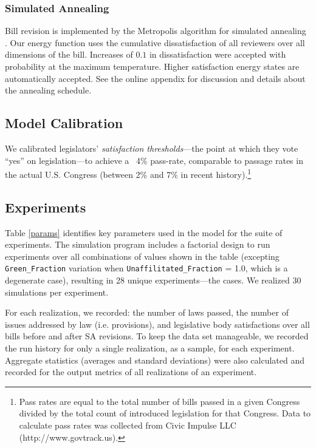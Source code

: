 \documentclass[pdftex,12pt,oribibl]{llncs}
\begin{document}
\subsubsection{Simulated Annealing}
Bill revision is implemented by the Metropolis algorithm for simulated annealing \parencite{mrrt53, kgv}.
Our energy function uses the cumulative dissatisfaction of all reviewers over all dimensions of the bill. 
Increases of $0.1$ in dissatisfaction were accepted with probability  at the maximum temperature. 
Higher satisfaction energy states are automatically accepted.
See the online appendix for discussion and details about the annealing schedule.

\subsection{Model Calibration}
We calibrated legislators' \textit{satisfaction thresholds}---the point at which they vote ``yes'' on legislation---to achieve a ~4\% pass-rate, comparable to passage rates in the actual U.S. Congress (between 2\% and 7\% in recent history).\footnote{Pass rates are equal to the total number of bills passed in a given Congress divided by the total count of introduced legislation for that Congress. Data to calculate pass rates was collected from Civic Impulse LLC (http://www.govtrack.us).\label{passfn}}

\subsection{Experiments}
Table \ref{params} identifies key parameters used in the model for the suite of experiments.
The simulation program includes a factorial design to run experiments over all combinations of values shown in the table (excepting \texttt{Green\_Fraction} variation when {\texttt{Unaffilitated\_Fraction} = 1.0}, which is a degenerate case), resulting in 28 unique experiments---the cases.
We realized 30 simulations per experiment.

For each realization, we recorded: the number of laws passed, the number of issues addressed by law (i.e. provisions), and legislative body satisfactions over all bills before and after SA revisions. 
To keep the data set manageable, we recorded the run history for only a single realization, as a sample, for each experiment.
Aggregate statistics (averages and standard deviations) were also calculated and recorded for the output metrics of all realizations of an experiment.
\end{document}
